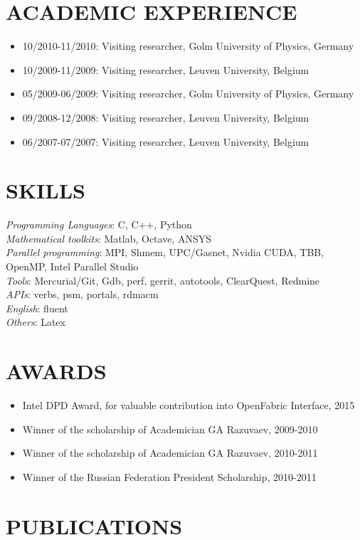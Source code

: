 \documentclass[line,margin,12pt]{res}
\begin{document}
\begin{resume}
\section{ACADEMIC EXPERIENCE}{}
\begin{itemize}
\item 10/2010-11/2010: Visiting researcher, Golm University of Physics, Germany
\item 10/2009-11/2009: Visiting researcher, Leuven University, Belgium
\item 05/2009-06/2009: Visiting researcher, Golm University of Physics, Germany
\item 09/2008-12/2008: Visiting researcher, Leuven University, Belgium
\item 06/2007-07/2007: Visiting researcher, Leuven University, Belgium
\end{itemize}

\section{SKILLS}
{\sl Programming Languages}: C, C++, Python\\
{\sl Mathematical toolkits}: Matlab, Octave, ANSYS\\
{\sl Parallel programming}: MPI, Shmem, UPC/Gasnet, Nvidia CUDA, TBB, OpenMP, Intel Parallel Studio\\
{\sl Tools}: Mercurial/Git, Gdb, perf, gerrit, autotools, ClearQuest, Redmine\\
{\sl APIs}: verbs, psm, portals, rdmacm \\
{\sl English}: fluent \\
{\sl Others}: Latex \\

\section{AWARDS}
\begin{itemize}
\item Intel DPD Award, for valuable contribution into OpenFabric Interface, 2015
\item Winner of the scholarship of Academician GA Razuvaev, 2009-2010
\item Winner of the scholarship of Academician GA Razuvaev, 2010-2011
\item Winner of the Russian Federation President Scholarship, 2010-2011
\end{itemize}

\section{PUBLICATIONS}

\end{resume}
\end{document}
